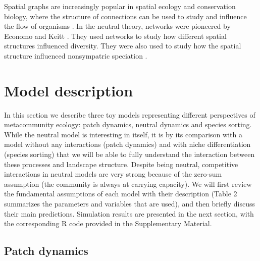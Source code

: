 \documentclass[12pt]{article}
\begin{document}
Spatial graphs are increasingly popular in spatial ecology and conservation
biology, where the structure of connections can be used to study and influence
the flow of organisms \parencite{min07,fal07,min08,gar08,urb09,dal10}. In the
neutral theory, networks were pioneered by Economo and Keitt
\parencite{Economo2008, eco10}. They used networks to study how different
spatial structures influenced diversity. They were also used to study how the
spatial structure influenced nonsympatric speciation
\parencite{Desjardins2012a,Desjardins2012b}. 

\section*{Model description}

In this section we describe three toy models representing different
perspectives of metacommunity ecology: patch dynamics, neutral dynamics and
species sorting. While the neutral model is interesting in itself, it is by its
comparison with a model without any interactions (patch dynamics) and with niche
differentiation (species sorting) that we will be able to fully understand the
interaction between these processes and landscape structure. Despite being neutral,
competitive interactions in neutral models are very strong because of the
zero-sum assumption (the community is always at carrying capacity). We will
first review the fundamental assumptions of each model with their description
(Table 2 summarizes the parameters and variables that are used), and then
briefly discuss their main predictions. Simulation results are presented in the
next section, with the corresponding R code provided in the Supplementary
Material.

\subsection*{Patch dynamics}
\end{document}
